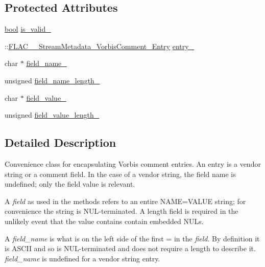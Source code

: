 \subsection*{Protected Attributes}
\begin{DoxyCompactItemize}
\item 
\hyperlink{mac_2config_2i386_2lib-src_2libsoxr_2soxr-config_8h_abb452686968e48b67397da5f97445f5b}{bool} \hyperlink{class_f_l_a_c_1_1_metadata_1_1_vorbis_comment_1_1_entry_a4e05497ba9a9e4e5e5e00e9e0de3313f}{is\+\_\+valid\+\_\+}
\item 
\+::\hyperlink{struct_f_l_a_c_____stream_metadata___vorbis_comment___entry}{F\+L\+A\+C\+\_\+\+\_\+\+Stream\+Metadata\+\_\+\+Vorbis\+Comment\+\_\+\+Entry} \hyperlink{class_f_l_a_c_1_1_metadata_1_1_vorbis_comment_1_1_entry_a857c8da808b7e3d28ef671e085304055}{entry\+\_\+}
\item 
char $\ast$ \hyperlink{class_f_l_a_c_1_1_metadata_1_1_vorbis_comment_1_1_entry_a0f587a7ee57eae5064504a3c129a4e78}{field\+\_\+name\+\_\+}
\item 
unsigned \hyperlink{class_f_l_a_c_1_1_metadata_1_1_vorbis_comment_1_1_entry_a122ef21f920ef8cc313fa2b1874c2555}{field\+\_\+name\+\_\+length\+\_\+}
\item 
char $\ast$ \hyperlink{class_f_l_a_c_1_1_metadata_1_1_vorbis_comment_1_1_entry_a4fba27f11d6cb9d138c45f3d51c25759}{field\+\_\+value\+\_\+}
\item 
unsigned \hyperlink{class_f_l_a_c_1_1_metadata_1_1_vorbis_comment_1_1_entry_aec6d93f021349712ccfcbbe4acc57b0d}{field\+\_\+value\+\_\+length\+\_\+}
\end{DoxyCompactItemize}


\subsection{Detailed Description}
Convenience class for encapsulating Vorbis comment entries. An entry is a vendor string or a comment field. In the case of a vendor string, the field name is undefined; only the field value is relevant.

A {\itshape field} as used in the methods refers to an entire \textquotesingle{}N\+A\+ME=V\+A\+L\+UE\textquotesingle{} string; for convenience the string is N\+U\+L-\/terminated. A length field is required in the unlikely event that the value contains contain embedded N\+U\+Ls.

A {\itshape field\+\_\+name} is what is on the left side of the first \textquotesingle{}=\textquotesingle{} in the {\itshape field}. By definition it is A\+S\+C\+II and so is N\+U\+L-\/terminated and does not require a length to describe it. {\itshape field\+\_\+name} is undefined for a vendor string entry.

